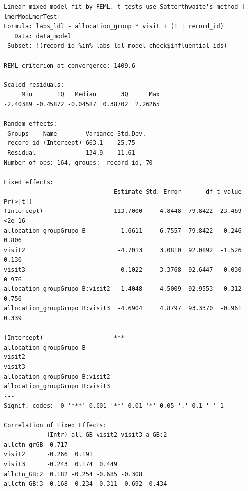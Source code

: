 \documentclass[
  letterpaper,
  DIV=11,
  numbers=noendperiod]{scrartcl}
\newenvironment{Shaded}{\begin{snugshade}}{\end{snugshade}}
\newcommand{\NormalTok}[1]{\textcolor[rgb]{0.00,0.23,0.31}{#1}}
\newcommand{\SpecialCharTok}[1]{\textcolor[rgb]{0.37,0.37,0.37}{#1}}
\begin{document}
\begin{verbatim}
Linear mixed model fit by REML. t-tests use Satterthwaite's method [
lmerModLmerTest]
Formula: labs_ldl ~ allocation_group * visit + (1 | record_id)
   Data: data_model
 Subset: !(record_id %in% labs_ldl_model_check$influential_ids)

REML criterion at convergence: 1409.6

Scaled residuals: 
     Min       1Q   Median       3Q      Max 
-2.40389 -0.45872 -0.04587  0.38702  2.26265 

Random effects:
 Groups    Name        Variance Std.Dev.
 record_id (Intercept) 663.1    25.75   
 Residual              134.9    11.61   
Number of obs: 164, groups:  record_id, 70

Fixed effects:
                               Estimate Std. Error       df t value Pr(>|t|)
(Intercept)                    113.7000     4.8448  79.8422  23.469   <2e-16
allocation_groupGrupo B         -1.6611     6.7557  79.8422  -0.246    0.806
visit2                          -4.7013     3.0810  92.0892  -1.526    0.130
visit3                          -0.1022     3.3768  92.6447  -0.030    0.976
allocation_groupGrupo B:visit2   1.4048     4.5009  92.9553   0.312    0.756
allocation_groupGrupo B:visit3  -4.6904     4.8797  93.3370  -0.961    0.339
                                  
(Intercept)                    ***
allocation_groupGrupo B           
visit2                            
visit3                            
allocation_groupGrupo B:visit2    
allocation_groupGrupo B:visit3    
---
Signif. codes:  0 '***' 0.001 '**' 0.01 '*' 0.05 '.' 0.1 ' ' 1

Correlation of Fixed Effects:
            (Intr) all_GB visit2 visit3 a_GB:2
allctn_grGB -0.717                            
visit2      -0.266  0.191                     
visit3      -0.243  0.174  0.449              
allctn_GB:2  0.182 -0.254 -0.685 -0.308       
allctn_GB:3  0.168 -0.234 -0.311 -0.692  0.434
\end{verbatim}

\begin{Shaded}
\end{Shaded}
\end{document}
